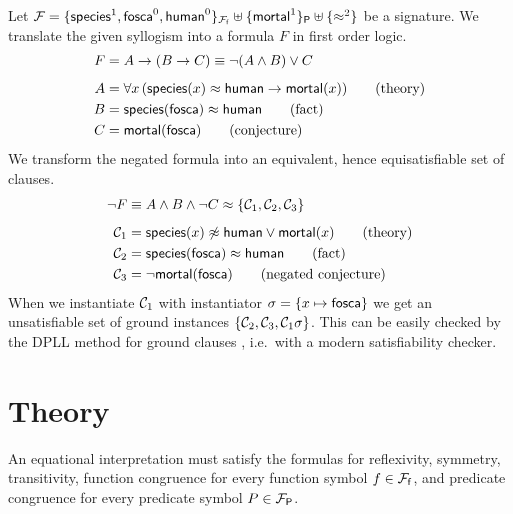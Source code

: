 \begin{example} Let ${\mathcal F} = \{\mathsf{species}^1, \mathsf{fosca}^0, \mathsf{human}^0 \}_{{{\mathcal F}_{\mathsf f}}} \uplus \{ \mathsf{mortal}^1  \}_{{\mathsf P}} \uplus \{\approx^2\}$ be a signature.
	We translate the given syllogism into a formula $F$ in first order logic.
	\begin{align*}
	F &= A \rightarrow (B \rightarrow C) \equiv \lnot(A\land B) \lor C\\[0.5em]
	A &= \forall x\,(\mathsf{species}(x) \approx \mathsf{human} \rightarrow \mathsf{mortal}(x)) 	\tag{theory}\\
	B &= \mathsf{species}(\mathsf{fosca}) \approx \mathsf{human} 							\tag{fact}\\
	C &= \mathsf{mortal}(\mathsf{fosca})										\tag{conjecture}
	\end{align*}
%	 
	We transform the negated formula into an equivalent, hence equisatisfiable set of clauses.
%
\begin{align*}
\lnot F &\equiv A\land B \land\lnot C
\approx \{ {\mathcal C}_1, {\mathcal C}_2, {\mathcal C}_3 \} \\[0.5em]
{\mathcal C}_1 &= \mathsf{species}(x)\not\approx\mathsf{human}\lor\mathsf{mortal}(x) \tag{theory}\\
{\mathcal C}_2 &= \mathsf{species}(\mathsf{fosca})\approx\mathsf{human} \tag{fact} \\
{\mathcal C}_3 &= \lnot\mathsf{mortal}(\mathsf{fosca}) \tag{negated conjecture} \\
\end{align*}
When we instantiate ${\mathcal C}_1$ with instantiator $\sigma = \{x\mapsto\mathsf{fosca}\}$ we get an unsatisfiable 
set of ground instances $\{ {\mathcal C}_2, {\mathcal C}_3, {\mathcal C}_1\sigma  \}$.
This can be easily checked by the DPLL 
method for ground clauses \cite{Davis:1962:MPT:368273.368557, Davis:1960:CPQ:321033.321034},
i.e.~with a modern satisfiability checker.

\section{Theory}



	An equational interpretation must satisfy the formulas for reflexivity, symmetry, transitivity, 
	function congruence for every function symbol $f\in{{\mathcal F}_{\mathsf f}}$, 
	and predicate congruence for every predicate symbol $P\in{{\mathcal F}_{\mathsf P}}$.

%


\end{example}
